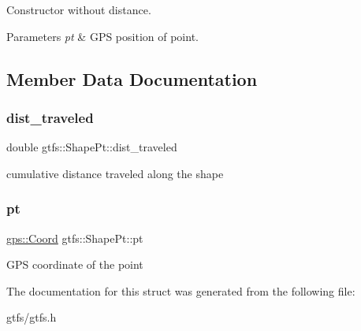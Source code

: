 Constructor without distance. 
\begin{DoxyParams}{Parameters}
{\em pt} & G\+PS position of point. \\
\hline
\end{DoxyParams}


\subsection{Member Data Documentation}
\mbox{\label{structgtfs_1_1ShapePt_acb29ef40a33bee6b4000c31731e25073}} 
\subsubsection{\texorpdfstring{dist\+\_\+traveled}{dist\_traveled}}
{\footnotesize\ttfamily double gtfs\+::\+Shape\+Pt\+::dist\+\_\+traveled}

cumulative distance traveled along the shape \mbox{\label{structgtfs_1_1ShapePt_ab79eb8263213afd27be9b257fca8515a}} 
\subsubsection{\texorpdfstring{pt}{pt}}
{\footnotesize\ttfamily \hyperlink{classgps_1_1Coord}{gps\+::\+Coord} gtfs\+::\+Shape\+Pt\+::pt}

G\+PS coordinate of the point 

The documentation for this struct was generated from the following file\+:\begin{DoxyCompactItemize}
\item 
gtfs/gtfs.\+h\end{DoxyCompactItemize}
